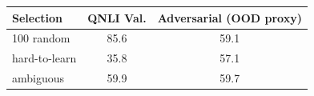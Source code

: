 \begin{tabular}{lcc}
Selection & QNLI Val. & Adversarial (OOD proxy) \\
\hline
100%
random & 85.6 & 59.1 \\
hard-to-learn & 35.8 & 57.1 \\
ambiguous & 59.9 & 59.7 \\
\end{tabular}
